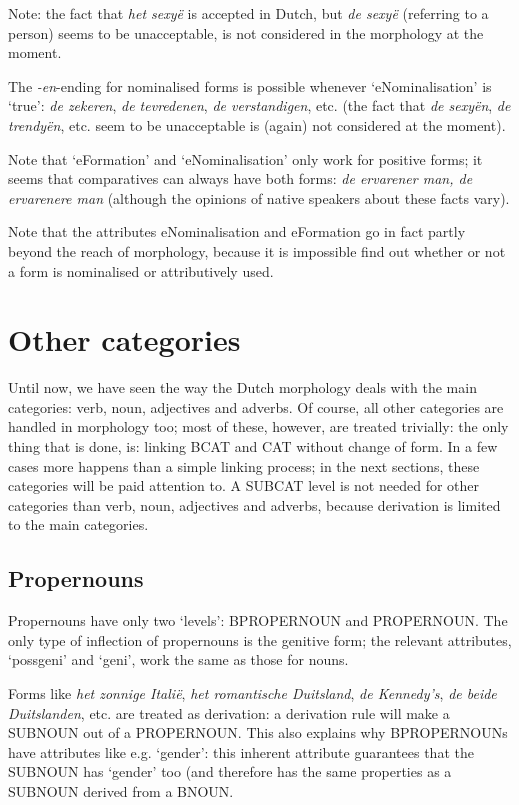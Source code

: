 Note: the fact that {\em het sexy\"{e}} is accepted in Dutch, but
{\em de sexy\"{e}} 
(referring to a person) seems to be unacceptable, is not considered in the 
morphology at the moment.

The {\em -en}-ending for nominalised forms is possible whenever 
`eNominalisation'
is `true': {\em de zekeren}, {\em de tevredenen}, {\em de verstandigen}, etc. 
(the fact that {\em de sexy\"{e}n}, {\em de trendy\"{e}n}, etc. seem to be 
unacceptable is (again) not considered at the moment).

Note that `eFormation' and `eNominalisation' only work for positive forms;
it seems that comparatives can always have both forms: {\em de ervarener man, 
de ervarenere man} (although the opinions of native speakers about these 
facts vary).

Note that the attributes eNominalisation and eFormation go in fact partly 
beyond the reach of morphology, because it is impossible find out whether or 
not a form is nominalised or attributively used.


\newpage

\section{Other categories}

Until now, we have seen the way the Dutch morphology deals with the main
categories: verb, noun, adjectives and adverbs. Of course, all other categories
are handled in morphology too; most of these, however, are treated trivially:
the only thing that is done, is: linking BCAT and CAT without change of form. 
In a few cases more happens than a simple linking process; in the next
sections, these categories will be paid attention to. A SUBCAT level is
not needed for other categories than verb, noun, adjectives and adverbs, 
because derivation is limited to the main categories.


\subsection{Propernouns}

Propernouns have only two `levels': BPROPERNOUN and PROPERNOUN. The only type 
of inflection of propernouns is the genitive form; the relevant attributes,
`possgeni' and `geni', work the same as those for nouns.

Forms like {\em het zonnige Itali\"{e}}, {\em het romantische Duitsland},
{\em de Kennedy's}, {\em de beide Duitslanden}, etc. are treated as derivation:
a derivation rule will make a SUBNOUN out of a PROPERNOUN. This also explains
why BPROPERNOUNs have attributes like e.g. `gender': this inherent attribute 
guarantees that the SUBNOUN has `gender' too (and therefore has the same 
properties as a SUBNOUN derived from a BNOUN.

